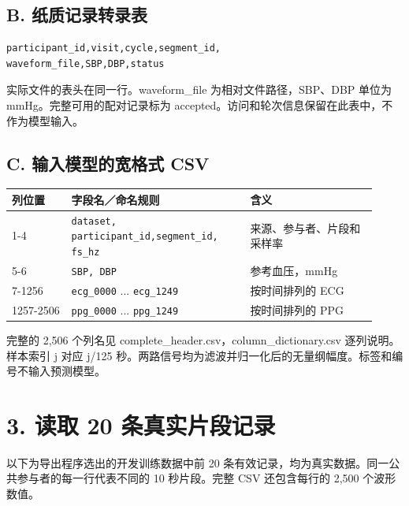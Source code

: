 \documentclass[11pt,letterpaper]{article}
\begin{document}
\subsection*{B. 纸质记录转录表}
\begin{verbatim}participant_id,visit,cycle,segment_id,
waveform_file,SBP,DBP,status\end{verbatim}
实际文件的表头在同一行。waveform\_file 为相对文件路径，SBP、DBP 单位为 mmHg。完整可用的配对记录标为 accepted。访问和轮次信息保留在此表中，不作为模型输入。
\subsection*{C. 输入模型的宽格式 CSV}

\par\smallskip
\begin{tabular}{@{}p{0.15\linewidth}p{0.45\linewidth}p{0.32\linewidth}@{}}\toprule
列位置 & 字段名／命名规则 & 含义\\\midrule
1-4 & \texttt{dataset, participant\_id,}\newline\texttt{segment\_id, fs\_hz} & 来源、参与者、片段和采样率\\
5-6 & \texttt{SBP, DBP} & 参考血压，mmHg\\
7-1256 & \texttt{ecg\_0000} ... \texttt{ecg\_1249} & 按时间排列的 ECG\\
1257-2506 & \texttt{ppg\_0000} ... \texttt{ppg\_1249} & 按时间排列的 PPG\\
\bottomrule\end{tabular}\par\smallskip
完整的 2,506 个列名见 complete\_header.csv，column\_dictionary.csv 逐列说明。样本索引 j 对应 j/125 秒。两路信号均为滤波并归一化后的无量纲幅度。标签和编号不输入预测模型。\newpage
\section*{3. 读取 20 条真实片段记录}
以下为导出程序选出的开发训练数据中前 20 条有效记录，均为真实数据。同一公共参与者的每一行代表不同的 10 秒片段。完整 CSV 还包含每行的 2,500 个波形数值。
\end{document}
